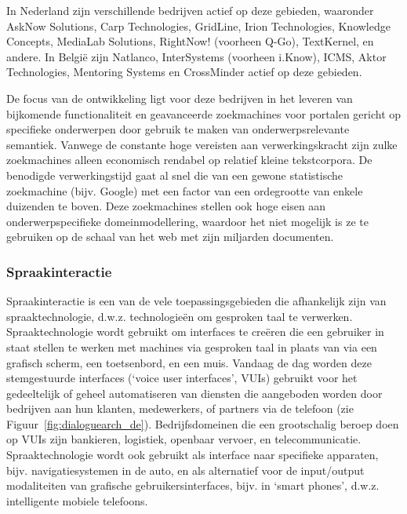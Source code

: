 \documentclass[]{../../metanetpaper}
\begin{document}
\begin{multicols}{2}
    In Nederland zijn verschillende bedrijven actief op deze gebieden, waaronder AskNow Solutions, Carp Technologies, GridLine, Irion Technologies, Knowledge Concepts, MediaLab Solutions, RightNow! (voorheen Q-Go), TextKernel, en andere. In Belgi{\"e} zijn Natlanco, InterSystems (voorheen i.Know), ICMS, Aktor Technologies, Mentoring Systems en CrossMinder actief op deze gebieden.

    De focus van de ontwikkeling ligt voor deze bedrijven in het leveren van bijkomende functionaliteit en geavanceerde zoekmachines voor portalen gericht op specifieke onderwerpen door gebruik te maken van onderwerpsrelevante semantiek. Vanwege de constante hoge vereisten aan verwerkingskracht zijn zulke zoekmachines alleen economisch rendabel op relatief kleine tekstcorpora. De benodigde verwerkingstijd gaat al snel die van een gewone statistische zoekmachine (bijv. Google) met een factor van een ordegrootte van enkele duizenden te boven. Deze zoekmachines stellen ook hoge eisen aan onderwerpspecifieke domeinmodellering, waardoor het niet mogelijk is ze te gebruiken op de schaal van het web met zijn miljarden documenten.

\subsubsection{Spraakinteractie}

  Spraakinteractie is een van de vele toepassingsgebieden die afhankelijk zijn van spraaktechnologie, d.w.z. technologie{\"e}n om gesproken taal te verwerken. Spraaktechnologie wordt gebruikt om interfaces te cre{\"e}ren die een gebruiker in staat stellen te werken met machines via gesproken taal in plaats van via een grafisch scherm, een toetsenbord, en een muis. Vandaag de dag worden deze stemgestuurde interfaces (`voice user interfaces', VUIs) gebruikt voor het gedeeltelijk of geheel automatiseren van diensten die aangeboden worden door bedrijven aan hun klanten, medewerkers, of partners via de telefoon (zie Figuur~\ref{fig:dialoguearch_de}). Bedrijfsdomeinen die een grootschalig beroep doen op VUIs zijn bankieren, logistiek, openbaar vervoer, en telecommunicatie. Spraaktechnologie wordt ook gebruikt als interface naar specifieke apparaten, bijv. navigatiesystemen in de auto, en als alternatief voor de input/output modaliteiten van grafische  gebruikersinterfaces, bijv.  in `smart phones', d.w.z. intelligente mobiele telefoons.



\end{multicols}
\end{document}
